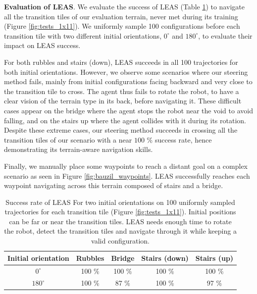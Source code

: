 
\hfill

\noindent\textbf{Evaluation of LEAS}. We evaluate the success of LEAS (Table \ref{tab:tests_1x11}) to navigate all the transition tiles of our evaluation terrain, never met during its training (Figure \ref{fig:tests_1x11}).
We uniformly sample 100 configurations before each transition tile with two different initial orientations, $0^{\circ}$ and $180^{\circ}$, to evaluate their impact on LEAS success. 


For both rubbles and stairs (down), LEAS succeeds in all 100 trajectories for both initial orientations. 
However, we observe some scenarios where our steering method fails, mainly from initial configurations facing backward and very close to the transition tile to cross. The agent thus fails to rotate the robot, to have a clear vision of the terrain type in its back, before navigating it. 
These difficult cases appear on the bridge where the agent stops the robot near the void to avoid falling, and on the stairs up where the agent collides with it during its rotation.
Despite these extreme cases, our steering method succeeds in crossing all the transition tiles of our scenario with a near $100$ \% success rate, hence demonstrating its terrain-aware navigation skills.


Finally, we manually place some waypoints to reach a distant goal on a complex scenario as seen in Figure \ref{fig:bauzil_waypoints}. LEAS successfully reaches each waypoint navigating across this terrain composed of stairs and a bridge.

\begin{table}[h]
\centering
\begin{tabular}{ |c|c|c|c|c| } 
    \hline
    Initial orientation & Rubbles & Bridge & Stairs (down) & Stairs (up) \\ 
    \hline
    $0^{\circ}$ & 100 \% & 100 \% & 100 \% & 100 \%  \\ 
    \hline
    $180^{\circ}$ & 100 \% & 87 \% & 100 \% & 97 \% \\
    \hline
\end{tabular}
\caption{Success rate of LEAS For two initial orientations on 100 uniformly sampled trajectories for each transition tile (Figure \ref{fig:tests_1x11}). Initial positions can be far or near the transition tiles. LEAS needs enough time to rotate the robot, detect the transition tiles and navigate through it while keeping a valid configuration.}
\label{tab:tests_1x11}
\end{table}


